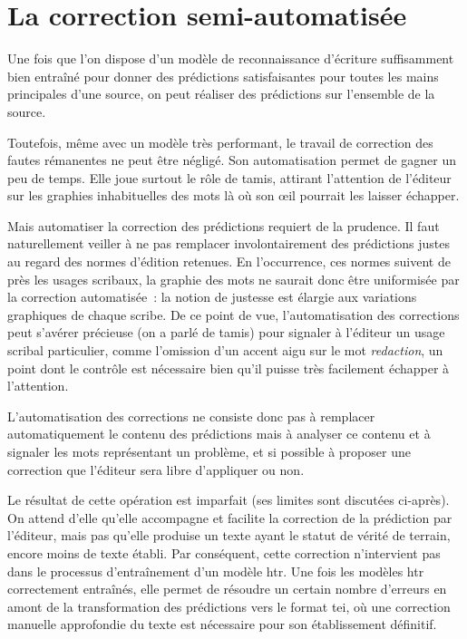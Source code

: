 \documentclass[a4paper,12pt,twoside]{book}
\begin{document}
		\section{La correction semi-automatisée}
			Une fois que l'on dispose d'un modèle de reconnaissance d'écriture suffisamment bien entraîné pour donner des \glspl{prédiction} satisfaisantes pour toutes les mains principales d'une source, on peut réaliser des \glspl{prédiction} sur l'ensemble de la source.
			
			Toutefois, même avec un modèle très performant, le travail de correction des fautes rémanentes ne peut être négligé. Son automatisation permet de gagner un peu de temps. Elle joue surtout le rôle de tamis, attirant l'attention de l'éditeur sur les graphies inhabituelles des mots là où son œil pourrait les laisser échapper.
			
			Mais automatiser la correction des \glspl{prédiction} requiert de la prudence. Il faut naturellement veiller à ne pas remplacer involontairement des \glspl{prédiction} justes au regard des normes d'édition retenues. En l'occurrence, ces normes suivent de près les usages scribaux, la graphie des mots ne saurait donc être uniformisée par la correction automatisée~: la notion de justesse est élargie aux variations graphiques de chaque scribe. De ce point de vue, l'automatisation des corrections peut s'avérer précieuse (on a parlé de tamis) pour signaler à l'éditeur un usage scribal particulier, comme l'omission d'un accent aigu sur le mot \textit{redaction}, un point dont le contrôle est nécessaire bien qu'il puisse très facilement échapper à l'attention.
			
			L'automatisation des corrections ne consiste donc pas à remplacer automatiquement le contenu des \glspl{prédiction} mais à analyser ce contenu et à signaler les mots représentant un problème, et si possible à proposer une correction que l'éditeur sera libre d'appliquer ou non.
			
			Le résultat de cette opération est imparfait (ses limites sont discutées ci-après). On attend d'elle qu'elle accompagne et facilite la correction de la \gls{prédiction} par l'éditeur, mais pas qu'elle produise un texte ayant le statut de vérité de terrain, encore moins de texte établi. Par conséquent, cette correction n'intervient pas dans le processus d'entraînement d'un modèle \gls{htr}. Une fois les modèles \gls{htr} correctement entraînés, elle permet de résoudre un certain nombre d'erreurs en amont de la transformation des \glspl{prédiction} vers le format \gls{tei}, où une correction manuelle approfondie du texte est nécessaire pour son établissement définitif.
			
\end{document}
